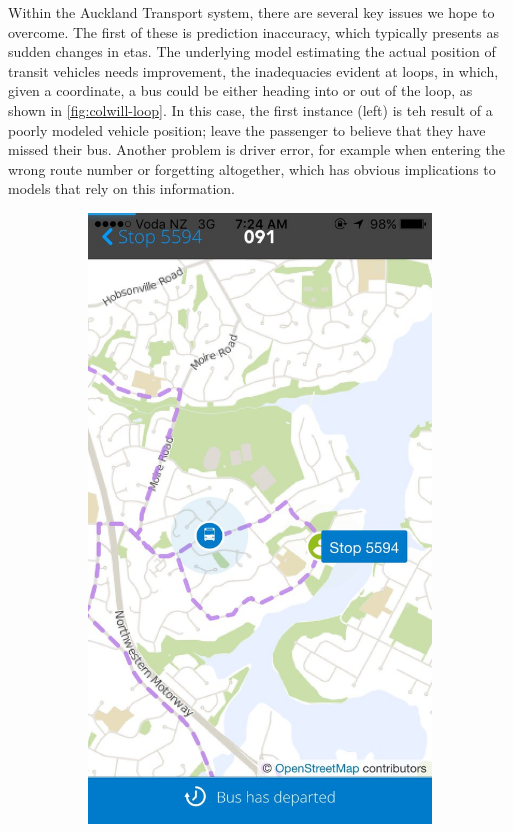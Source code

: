\documentclass[12pt,a4paper]{article}
\begin{document}
Within the Auckland Transport system, there are several key issues we hope to overcome.
The first of these is prediction inaccuracy,
which typically presents as sudden changes in \glspl{eta}.
The underlying model estimating the actual position of transit vehicles needs improvement,
the inadequacies evident at loops, in which, given a coordinate,
a bus could be either heading into or out of the loop,
as shown in \vref{fig:colwill-loop}.
In this case, the first instance (left) is teh result of a poorly modeled vehicle position;
leave the passenger to believe that they have missed their bus.
Another problem is driver error, 
for example when entering the wrong route number or forgetting altogether,
which has obvious implications to models that rely on this information.


\begin{figure}[bt]
  \centering
  \begin{subfigure}{0.4\textwidth}
    \includegraphics[width=\textwidth,trim={0 0 0 15cm},clip]{bus-loop-durp1.jpg}

\end{subfigure}
\end{figure}
\end{document}
